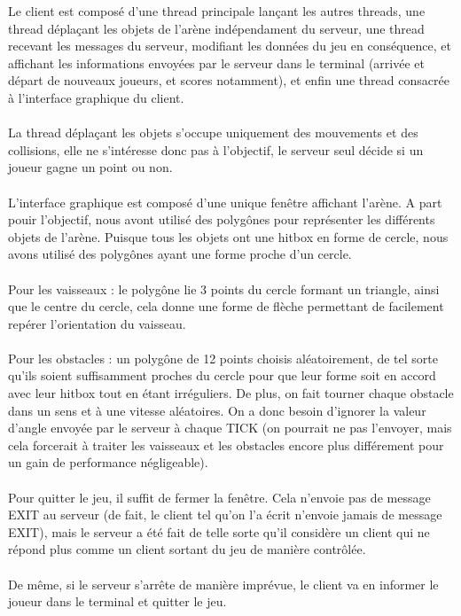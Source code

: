 \documentclass{article}
\begin{document}
Le client est composé d'une thread principale lançant les autres threads, une thread déplaçant les objets de l'arène indépendament du serveur,
une thread recevant les messages du serveur, modifiant les données du jeu en conséquence, et affichant les informations envoyées par le serveur
dans le terminal (arrivée et départ de nouveaux joueurs, et scores notamment), et enfin une thread consacrée à l'interface graphique du client.\\
\\
La thread déplaçant les objets s'occupe uniquement des mouvements et des collisions, elle ne s'intéresse donc pas à l'objectif, le serveur seul décide si
un joueur gagne un point ou non.\\
\\
L'interface graphique est composé d'une unique fenêtre affichant l'arène. A part pouir l'objectif, nous avont utilisé des polygônes pour représenter les différents
objets de l'arène. Puisque tous les objets ont une hitbox en forme de cercle, nous avons utilisé des polygônes ayant une forme proche d'un cercle.\\
\\
Pour les vaisseaux : le polygône lie 3 points du cercle formant un triangle, ainsi que le centre du cercle, cela donne une forme de flèche
permettant de facilement repérer l'orientation du vaisseau.\\
\\
Pour les obstacles : un polygône de 12 points choisis aléatoirement, de tel sorte qu'ils soient suffisamment proches du cercle pour que leur forme
soit en accord avec leur hitbox tout en étant irréguliers. De plus, on fait tourner chaque obstacle dans un sens et à une vitesse aléatoires. On a donc besoin
d'ignorer la valeur d'angle envoyée par le serveur à chaque TICK (on pourrait ne pas l'envoyer, mais cela forcerait à traiter les vaisseaux et les obstacles encore plus
différement pour un gain de performance négligeable).\\
\\
Pour quitter le jeu, il suffit de fermer la fenêtre. Cela n'envoie pas de message EXIT au serveur (de fait, le client tel qu'on l'a écrit n'envoie jamais de message EXIT),
mais le serveur a été fait de telle sorte qu'il considère un client qui ne répond plus comme un client sortant du jeu de manière contrôlée.\\
\\
De même, si le serveur s'arrête de manière imprévue, le client va en informer le joueur dans le terminal et quitter le jeu.
\end{document}
